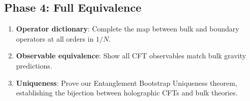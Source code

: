 \documentclass[12pt,a4paper]{article}
\begin{document}
\subsection{Phase 4: Full Equivalence}

\begin{enumerate}
    \item \textbf{Operator dictionary}: Complete the map between bulk and boundary operators at all orders in $1/N$.
    
    \item \textbf{Observable equivalence}: Show all CFT observables match bulk gravity predictions.
    
    \item \textbf{Uniqueness}: Prove our Entanglement Bootstrap Uniqueness theorem, establishing the bijection between holographic CFTs and bulk theories.
\end{enumerate}
\end{document}
